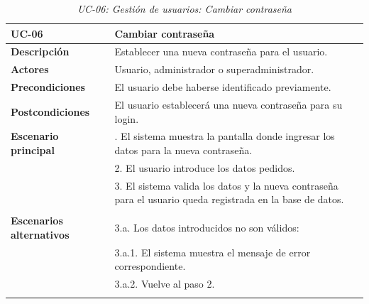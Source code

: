 \begin{table}
  \begin{center}
    \begin{tabularx}{16.4cm}{|l|X|}
      \hline
      \textbf{UC-06} & \textbf{Cambiar contraseña}\\
      \hline
      \textbf{Descripción} & Establecer una nueva contraseña para el usuario.\\
      \hline
      \textbf{Actores} & Usuario, administrador o superadministrador.\\
      \hline
      \textbf{Precondiciones} & El usuario debe haberse identificado previamente.\\
      \hline
      \textbf{Postcondiciones} & El usuario establecerá una nueva contraseña para su login.\\
      \hline
      \textbf{Escenario principal} & \smallskip 1. El sistema muestra la pantalla donde ingresar los datos para la nueva contraseña.\\
      & 2. El usuario introduce los datos pedidos.\\
      & 3. El sistema valida los datos y la nueva contraseña para el usuario queda registrada en la base de datos.\\
      & \\
      \hline
      \textbf{Escenarios alternativos} & \smallskip 3.a. Los datos introducidos no son válidos:\\
      & \hspace{0.3cm} 3.a.1. El sistema muestra el mensaje de error correspondiente.\\
      & \hspace{0.3cm} 3.a.2. Vuelve al paso 2.\\
      & \\
      \hline
    \end{tabularx}
    \caption{\textit{UC-06: Gestión de usuarios: Cambiar contraseña}}
    \label{tab:CU-cambiar-contrasena}
  \end{center}
\end{table}


